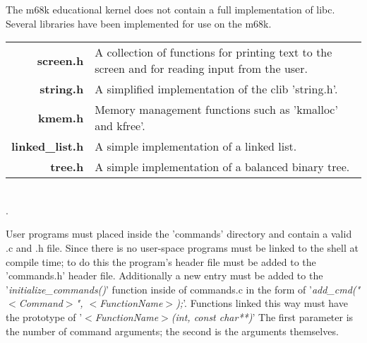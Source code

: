 \documentclass{article}
\begin{document}

The m68k educational kernel does not contain a full implementation of libc. Several libraries have been implemented for use on the m68k.\\

\begin{tabulary}{\textwidth}{r L}
\bf{screen.h} & A collection of functions for printing text to the screen and for reading input from the user.\\
\bf{string.h} & A simplified implementation of the clib 'string.h'.\\
\bf{kmem.h} & Memory management functions such as 'kmalloc' and kfree'.\\
\bf{linked\_list.h} & A simple implementation of a linked list.\\
\bf{tree.h} & A simple implementation of a balanced binary tree.\\
\end{tabulary}\\
{\tiny.}\\


User programs must placed inside the 'commands' directory and contain a valid .c and .h file. Since there is no user-space programs must be linked to the shell at compile time; to do this the program's header file must be added to the 'commands.h' header file. Additionally a new entry must be added to the '\emph{initialize\_commands()}' function inside of commands.c in the form of '\emph{add\_cmd("$<$Command$>$",  $<$FunctionName$>$);}'. Functions linked this way must have the prototype of '\emph{$<$FunctionName$>$(int, const char**)}' The first parameter is the number of command arguments; the second is the arguments themselves.\\
\end{document}
